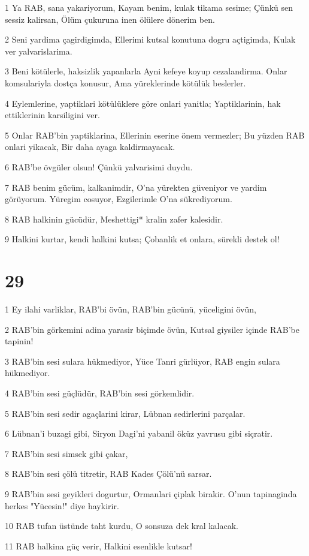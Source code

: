 \par 1 Ya RAB, sana yakariyorum, Kayam benim, kulak tikama sesime; Çünkü sen sessiz kalirsan, Ölüm çukuruna inen ölülere dönerim ben.
\par 2 Seni yardima çagirdigimda, Ellerimi kutsal konutuna dogru açtigimda, Kulak ver yalvarislarima.
\par 3 Beni kötülerle, haksizlik yapanlarla Ayni kefeye koyup cezalandirma. Onlar komsulariyla dostça konusur, Ama yüreklerinde kötülük beslerler.
\par 4 Eylemlerine, yaptiklari kötülüklere göre onlari yanitla; Yaptiklarinin, hak ettiklerinin karsiligini ver.
\par 5 Onlar RAB'bin yaptiklarina, Ellerinin eserine önem vermezler; Bu yüzden RAB onlari yikacak, Bir daha ayaga kaldirmayacak.
\par 6 RAB'be övgüler olsun! Çünkü yalvarisimi duydu.
\par 7 RAB benim gücüm, kalkanimdir, O'na yürekten güveniyor ve yardim görüyorum. Yüregim cosuyor, Ezgilerimle O'na sükrediyorum.
\par 8 RAB halkinin gücüdür, Meshettigi* kralin zafer kalesidir.
\par 9 Halkini kurtar, kendi halkini kutsa; Çobanlik et onlara, sürekli destek ol!

\chapter{29}

\par 1 Ey ilahi varliklar, RAB'bi övün, RAB'bin gücünü, yüceligini övün,
\par 2 RAB'bin görkemini adina yarasir biçimde övün, Kutsal giysiler içinde RAB'be tapinin!
\par 3 RAB'bin sesi sulara hükmediyor, Yüce Tanri gürlüyor, RAB engin sulara hükmediyor.
\par 4 RAB'bin sesi güçlüdür, RAB'bin sesi görkemlidir.
\par 5 RAB'bin sesi sedir agaçlarini kirar, Lübnan sedirlerini parçalar.
\par 6 Lübnan'i buzagi gibi, Siryon Dagi'ni yabanil öküz yavrusu gibi siçratir.
\par 7 RAB'bin sesi simsek gibi çakar,
\par 8 RAB'bin sesi çölü titretir, RAB Kades Çölü'nü sarsar.
\par 9 RAB'bin sesi geyikleri dogurtur, Ormanlari çiplak birakir. O'nun tapinaginda herkes "Yücesin!" diye haykirir.
\par 10 RAB tufan üstünde taht kurdu, O sonsuza dek kral kalacak.
\par 11 RAB halkina güç verir, Halkini esenlikle kutsar!

